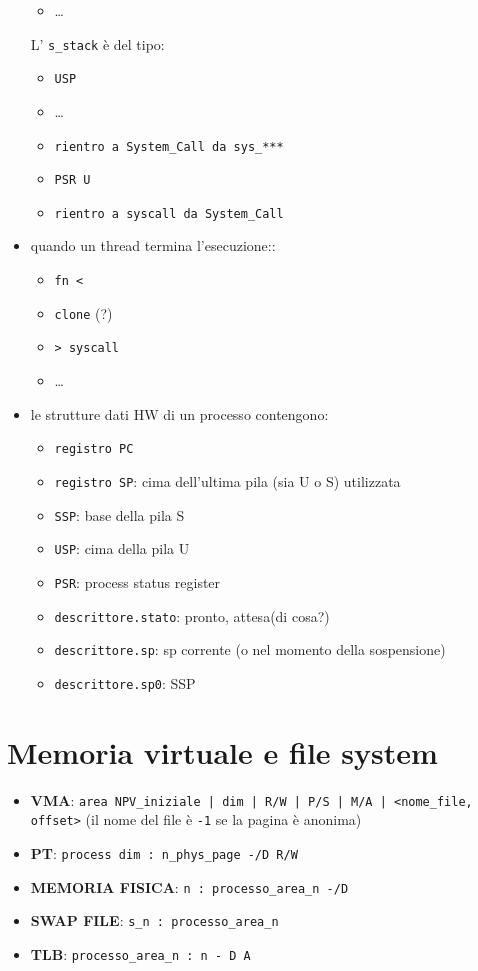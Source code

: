 \documentclass[12pt, a4paper]{report}
\begin{document}
\begin{itemize}
\begin{itemize}
		      \item \dots
	      \end{itemize}
	      L' \texttt{s\_stack} è del tipo:
	      \begin{itemize}
		      \item \texttt{USP}
		      \item \dots
		      \item \texttt{rientro a System\_Call da sys\_***}
		      \item \texttt{PSR U}
		      \item \texttt{rientro a syscall da System\_Call}
	      \end{itemize}
	\item quando un thread termina l'esecuzione::
	      \begin{itemize}
		      \item \texttt{fn <}
		      \item \texttt{clone} (?) %
		      \item \texttt{> syscall}
		      \item \dots
	      \end{itemize}
	\item le strutture dati HW di un processo contengono:
	      \begin{itemize}
		      \item \texttt{registro PC}
		      \item \texttt{registro SP}: cima dell'ultima pila (sia U o S)
		            utilizzata
		      \item \texttt{SSP}: base della pila S
		      \item \texttt{USP}: cima della pila U
		      \item \texttt{PSR}: process status register
		      \item \texttt{descrittore.stato}: pronto, attesa(di cosa?)
		      \item \texttt{descrittore.sp}: sp corrente (o nel momento della
		            sospensione)
		      \item \texttt{descrittore.sp0}: SSP
	      \end{itemize}
\end{itemize}


\newpage
\section*{Memoria virtuale e file system}

\begin{itemize}
	\item \textbf{VMA}: \texttt{area NPV\_iniziale | dim | R/W | P/S | M/A |
		      <nome\_file, offset>}
	      (il nome del file è \texttt{-1} se la pagina è anonima)
	\item \textbf{PT}: \texttt{process dim : n\_phys\_page -/D R/W}
	\item \textbf{MEMORIA FISICA}: \texttt{n : processo\_area\_n -/D}
	\item \textbf{SWAP FILE}: \texttt{s\_n : processo\_area\_n}
	\item \textbf{TLB}: \texttt{processo\_area\_n : n - D A}
\end{itemize}
\end{document}
